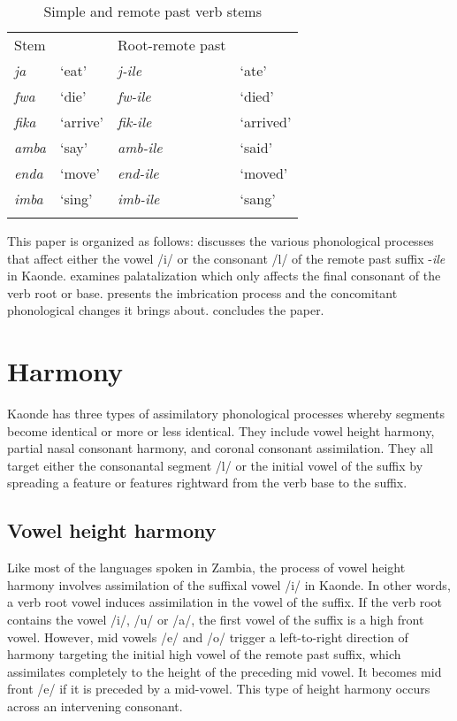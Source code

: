 \documentclass[output=paper]{langsci/langscibook}
\begin{document}
\begin{table}
\begin{tabular}{llll}
\lsptoprule
  Stem &  &   Root-remote past & \\
\textit{ja } & `eat' & \textit{j-ile} & `ate' \\
\textit{fwa} & `die' & \textit{fw-ile} & `died' \\
\textit{fika} & `arrive' & \textit{fik-ile} & `arrived' \\
\textit{amba} & `say' & \textit{amb-ile} & `said' \\
\textit{enda} & `move' & \textit{end-ile} & `moved' \\
\textit{imba} & `sing' & \textit{imb-ile} & `sang' \\

\lspbottomrule
\end{tabular}

\caption{Simple and remote past verb stems}
\label{tab:1.kawasha}

 \end{table}


This paper is organized as follows:  discusses the various phonological processes that affect either the vowel /i/ or the consonant /l/ of the remote past suffix -\textit{ile} in Kaonde.  examines palatalization which only affects the final consonant of the verb root or base.  presents the imbrication process and the concomitant phonological changes it brings about.  concludes the paper.


\section{Harmony} \label{§2:harmony.kawasha}

Kaonde has three types of assimilatory phonological processes whereby segments become identical or more or less identical. They include vowel height harmony, partial nasal consonant harmony, and coronal consonant assimilation. They all target either the consonantal segment /l/ or the initial vowel of the suffix by spreading a feature or features rightward from the verb base to the suffix.

\subsection{Vowel height harmony}

Like most of the languages spoken in Zambia, the process of vowel height harmony involves assimilation of the suffixal vowel /i/ in Kaonde. In other words, a verb root vowel induces assimilation in the vowel of the suffix. If the verb root contains the vowel /i/, /u/ or /a/, the first vowel of the suffix is a high front vowel. However, mid vowels /e/ and /o/ trigger a left-to-right direction of harmony targeting the initial high vowel of the remote past suffix, which assimilates completely to the height of the preceding mid vowel. It becomes mid front /e/ if it is preceded by a mid-vowel. This type of height harmony occurs across an intervening consonant.
\end{document}
